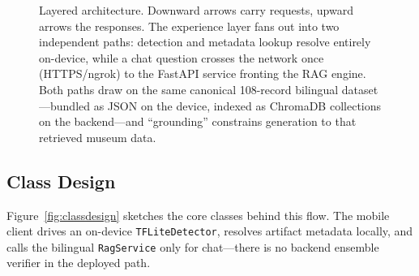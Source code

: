 \begin{figure}[htbp]
\caption{Layered architecture. Downward arrows carry requests, upward arrows the
responses. The experience layer fans out into two independent
paths: detection and metadata lookup resolve entirely on-device, while a chat
question crosses the network once (HTTPS/ngrok) to the FastAPI service fronting
the RAG engine. Both paths draw on the same canonical 108-record bilingual
dataset---bundled as JSON on the device, indexed as ChromaDB collections on the
backend---and ``grounding'' constrains generation to that retrieved museum data.}
\label{fig:layers}
\end{figure}

\FloatBarrier

\subsection{Class Design}

Figure~\ref{fig:classdesign} sketches the core classes behind this flow. The mobile
client drives an on-device \texttt{TFLiteDetector}, resolves artifact metadata locally,
and calls the bilingual \texttt{RagService} only for chat---there is no backend ensemble
verifier in the deployed path.

